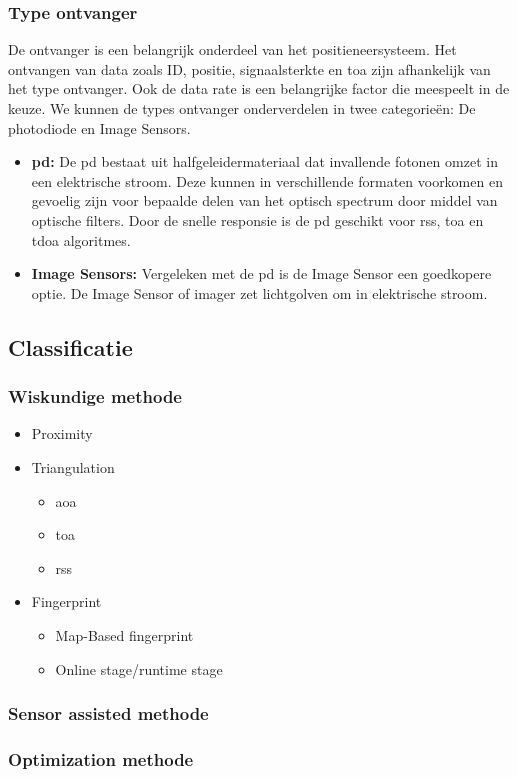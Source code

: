 \subsubsection{Type ontvanger}
De ontvanger is een belangrijk onderdeel van het positieneersysteem. Het ontvangen van data zoals ID, positie, signaalsterkte en \gls{toa} zijn afhankelijk van het type ontvanger. Ook de data rate is een belangrijke factor die meespeelt in de keuze. We kunnen de types ontvanger onderverdelen in twee categorie\"en: De photodiode en Image Sensors.
\begin{itemize}
	\item \textbf{\gls{pd}:} De \gls{pd} bestaat uit halfgeleidermateriaal dat invallende fotonen omzet in een elektrische stroom. Deze kunnen in verschillende formaten voorkomen en gevoelig zijn voor bepaalde delen van het optisch spectrum door middel van optische filters. Door de snelle responsie is de \gls{pd} geschikt voor \gls{rss}, \gls{toa} en \gls{tdoa} algoritmes.
	
	\item \textbf{Image Sensors:}  Vergeleken met de \gls{pd} is de Image Sensor een goedkopere optie. De Image Sensor of imager zet lichtgolven om in elektrische stroom.
\end{itemize}
\subsection{Classificatie}
\subsubsection{Wiskundige methode}

\begin{itemize}
	\item Proximity
	\item Triangulation
	\begin{itemize}
		\item \acrfull{aoa}
		\item \acrfull{toa}
		\item \acrfull{rss}
	\end{itemize}
	\item Fingerprint
	\begin{itemize}
		\item Map-Based fingerprint
		\item Online stage/runtime stage
	\end{itemize}
\end{itemize}
\subsubsection{Sensor assisted methode}
\subsubsection{Optimization methode}

\newpage
